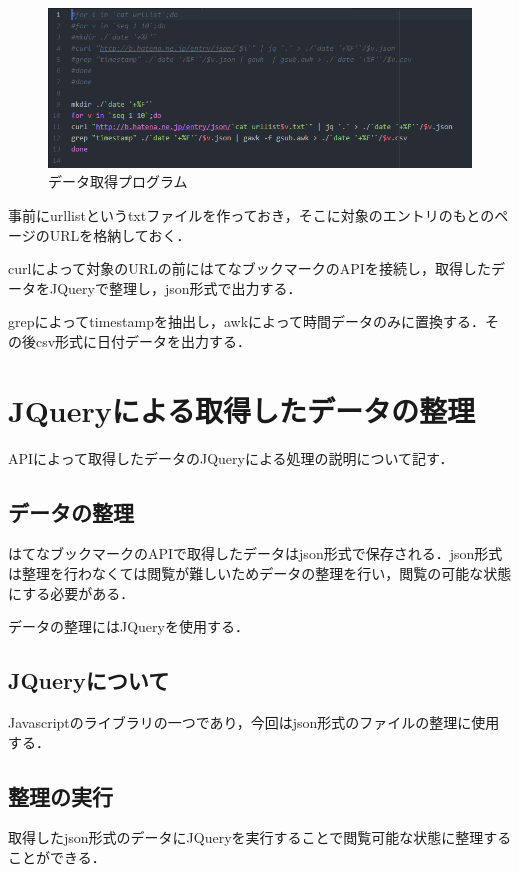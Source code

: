 \begin{figure}[htb]
\centering
\includegraphics[width=13cm]{sh.PNG}
\caption{データ取得プログラム}\label{sh}
\end{figure}
事前にurllistというtxtファイルを作っておき，そこに対象のエントリのもとのページのURLを格納しておく．\par
curlによって対象のURLの前にはてなブックマークのAPIを接続し，取得したデータをJQueryで整理し，json形式で出力する．\par
grepによってtimestampを抽出し，awkによって時間データのみに置換する．その後csv形式に日付データを出力する．


\newpage

\section{JQueryによる取得したデータの整理}
APIによって取得したデータのJQueryによる処理の説明について記す．

\subsection{データの整理}
はてなブックマークのAPIで取得したデータはjson形式で保存される．json形式は整理を行わなくては閲覧が難しいためデータの整理を行い，閲覧の可能な状態にする必要がある．\par
データの整理にはJQueryを使用する．

\subsection{JQueryについて}
Javascriptのライブラリの一つであり，今回はjson形式のファイルの整理に使用する．

\subsection{整理の実行}
取得したjson形式のデータにJQueryを実行することで閲覧可能な状態に整理することができる．


\newpage

